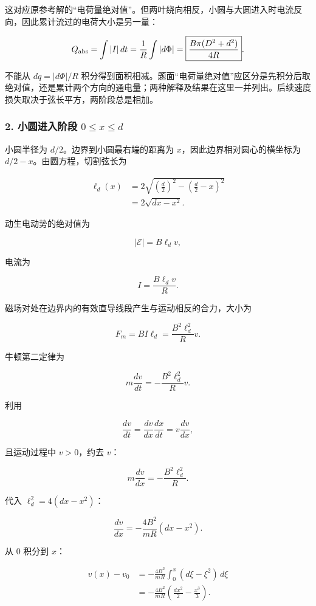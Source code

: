 \documentclass[12pt,a4paper,UTF8]{ctexart}
\begin{document}
这对应原参考解的``电荷量绝对值''。但两叶绕向相反，小圆与大圆进入时电流反向，因此累计流过的电荷大小是另一量：

\[Q_{\rm abs}=\int|I|\,dt=\frac1R\int|d\Phi|=\boxed{\frac{B\pi(D^2+d^2)}{4R}}.\]

不能从 \(dq=|d\Phi|/R\)
积分得到面积相减。题面``电荷量绝对值''应区分是先积分后取绝对值，还是累计两个方向的通电量；两种解释及结果在这里一并列出。后续速度损失取决于弦长平方，两阶段总是相加。

\subsubsection{\texorpdfstring{2. 小圆进入阶段
\(0\le x\le d\)}{2. 小圆进入阶段 0\textbackslash le x\textbackslash le d}}\label{ux5c0fux5706ux8fdbux5165ux9636ux6bb5-0le-xle-d}

小圆半径为 \(d/2\)。边界到小圆最右端的距离为
\(x\)，因此边界相对圆心的横坐标为 \(d/2-x\)。由圆方程，切割弦长为

\[
\begin{aligned}
\ell_d(x)
&=2\sqrt{\left(\frac d2\right)^2-\left(\frac d2-x\right)^2}\\
&=2\sqrt{dx-x^2}.
\end{aligned}
\]

动生电动势的绝对值为

\[
|\mathcal E|=B\ell_d v,
\]

电流为

\[
I=\frac{B\ell_d v}{R}.
\]

磁场对处在边界内的有效直导线段产生与运动相反的合力，大小为

\[
F_m=B I\ell_d
=\frac{B^2\ell_d^2}{R}v.
\]

牛顿第二定律为

\[
m\frac{dv}{dt}=-\frac{B^2\ell_d^2}{R}v.
\]

利用

\[
\frac{dv}{dt}=\frac{dv}{dx}\frac{dx}{dt}=v\frac{dv}{dx},
\]

且运动过程中 \(v>0\)，约去 \(v\)：

\[
m\frac{dv}{dx}=-\frac{B^2\ell_d^2}{R}.
\]

代入 \(\ell_d^2=4(dx-x^2)\)：

\[
\frac{dv}{dx}=-\frac{4B^2}{mR}(dx-x^2).
\]

从 \(0\) 积分到 \(x\)：

\[
\begin{aligned}
v(x)-v_0
&=-\frac{4B^2}{mR}\int_0^x(d\xi-\xi^2)\,d\xi\\
&=-\frac{4B^2}{mR}
\left(\frac{d x^2}{2}-\frac{x^3}{3}\right).
\end{aligned}
\]
\end{document}
